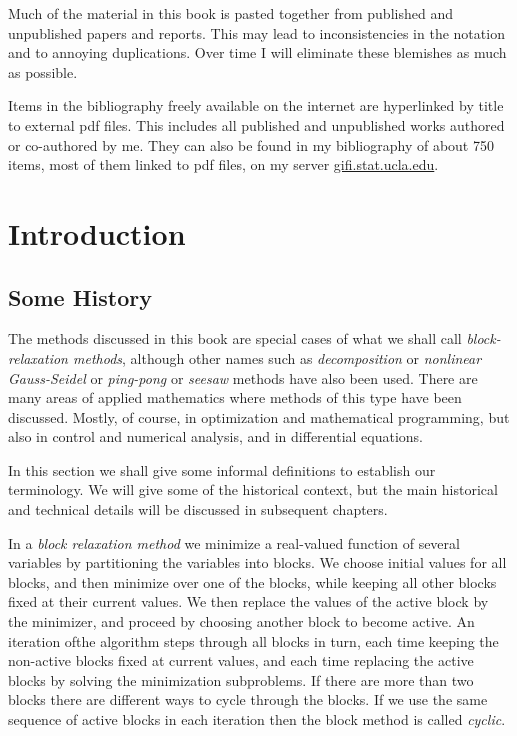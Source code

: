 \documentclass[
  12pt,
]{book}
\begin{document}
Much of the material in this book is pasted together from published and unpublished papers and reports. This may lead to inconsistencies in the notation and to annoying duplications. Over time I will eliminate these blemishes as much as possible.

Items in the bibliography freely available on the
internet are hyperlinked by title to external pdf files. This includes all published and unpublished works authored or co-authored by me. They can also be found in my bibliography of about 750 items, most of them linked to pdf files, on my server \href{http://gifi.stat.ucla.edu/janspubs/0_bib_material/index.html}{gifi.stat.ucla.edu}.

\hypertarget{introduction}{%
\chapter{Introduction}\label{introduction}}

\hypertarget{introduction:somehistory}{%
\section{Some History}\label{introduction:somehistory}}

The methods discussed in this book are special cases of what we shall call
\emph{block-relaxation methods}, although other names such as \emph{decomposition} or \emph{nonlinear Gauss-Seidel} or \emph{ping-pong} or \emph{seesaw} methods have also been used. There are many areas of applied mathematics where methods of this type have been discussed. Mostly, of course, in optimization and mathematical programming, but also in control and numerical analysis, and in differential equations.

In this section we shall give some informal definitions to establish our terminology. We will give some of the historical context, but the main historical and technical details will be discussed in subsequent chapters.

In a \emph{block relaxation method} we minimize a real-valued function of several variables by partitioning the variables into blocks. We choose initial values for all blocks, and then minimize over one of the blocks, while keeping all other blocks fixed at their current values. We then replace the values of the active block by the minimizer, and proceed by choosing another block to become active. An iteration ofthe algorithm steps through all blocks in turn, each time keeping the non-active blocks fixed at current values, and each time replacing the active blocks by solving the minimization subproblems. If there are more than two blocks there are different ways to cycle through the blocks. If we use the same sequence of active blocks in each iteration then the block method is called \emph{cyclic}.
\end{document}
